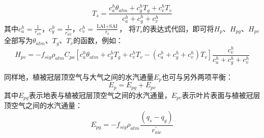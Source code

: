 \begin{equation}
T_{s}=\frac{c_{a}^{h} \theta_{atm}+c_{g}^{h} T_{g}+c_{v}^{h} T_{v}}{c_{a}^{h}+c_{g}^{h}+c_{v}^{h}}
\end{equation}
其中$c_a^h=\frac{1}{r_{ah}}$，$c_g^h=\frac{1}{r_{ah}^\prime}$，$c_v^h=\frac{\text {LAI}+\text {SAI}}{r_b}$，
将$T_s$的表达式代回，即可将$H_p$、$H_{pg}$、$H_{pv}$全部写为$\theta_{atm}$、$T_g$、$T_v$的函数，例如：
\begin{equation}
H_{p v}=-f_{sig} \rho_{atm} C_{p a}\left[c_{a}^{h} \theta_{atm}+c_{g}^{h} 
T_{g}+c_{v}^{h} T_{v}-\left(c_{a}^{h}+c_{g}^{h}+c_{v}^{h}\right)
T_{v}\right] \frac{c_{v}^{h}}{c_{a}^{h}+c_{g}^{h}+c_{v}^{h}}
\end{equation}


同样地，植被冠层顶空气与大气之间的水汽通量$E_p$也可与另外两项平衡：
\begin{equation}\label{EV_balance}
E_{p}=E_{p g}+E_{p v}
\end{equation}
其中$E_{pg}$表示地表与植被冠层顶空气之间的水汽通量，$E_{pv}$表示叶片表面与植被冠层顶空气之间的水汽通量：
\begin{equation}
E_{pg}=-f_{sig} \rho_{atm} \frac{\left(q_{s}-q_{g}\right)}{r_{a w}^{\prime}}
\end{equation}

